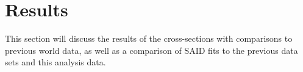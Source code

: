 \section{Results}
This section will discuss the results of the cross-sections with comparisons to previous world data, as well as a comparison of SAID fits to the previous data sets and this analysis data.



 